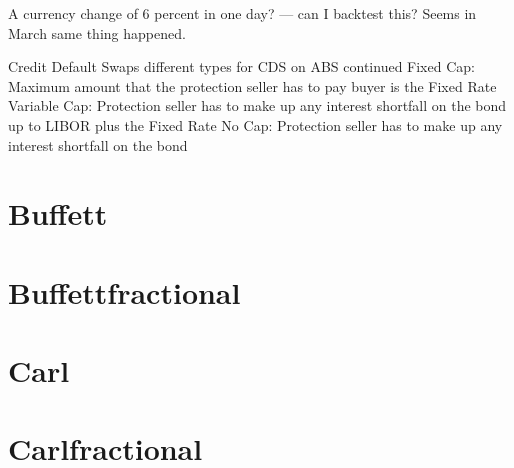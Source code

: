 \documentclass[letterpaper,10pt,english]{sphinxmanual}
\begin{document}
\begin{sphinxVerbatim}[commandchars=\\\{\}]
\end{sphinxVerbatim}

\sphinxAtStartPar
A currency change of 6 percent in one day? — can I backtest this? Seems
in March same thing happened.

\sphinxAtStartPar
Credit Default Swaps \textendash{} different types for CDS on ABS \sphinxhyphen{} continued \sphinxhyphen{}
Fixed Cap: Maximum amount that the protection seller has to pay buyer is
the Fixed Rate \sphinxhyphen{} Variable Cap: Protection seller has to make up any
interest shortfall on the bond up to LIBOR plus the Fixed Rate \sphinxhyphen{} No Cap:
Protection seller has to make up any interest shortfall on the bond

\sphinxAtStartPar
{}

\sphinxstepscope


\chapter{Buffett}
\label{\detokenize{Buffett2021-09-30:buffett}}\label{\detokenize{Buffett2021-09-30::doc}}
\noindent{}

\sphinxstepscope


\chapter{Buffettfractional}
\label{\detokenize{Buffettfractional2021-09-30:buffettfractional}}\label{\detokenize{Buffettfractional2021-09-30::doc}}
\noindent{}

\sphinxstepscope


\chapter{Carl}
\label{\detokenize{Carl2021-09-30:carl}}\label{\detokenize{Carl2021-09-30::doc}}
\noindent{}

\sphinxstepscope


\chapter{Carlfractional}
\label{\detokenize{Carlfractional2021-09-30:carlfractional}}\label{\detokenize{Carlfractional2021-09-30::doc}}
\noindent{}
\end{document}
